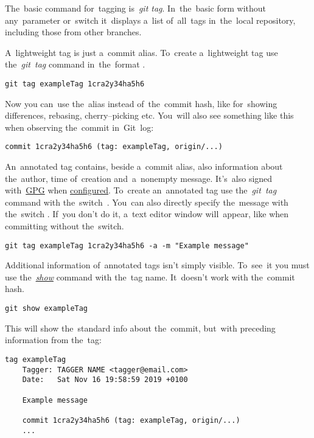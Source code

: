 The~basic command for~tagging is~\textit{git tag}.
In~the~basic form without any~parameter or~switch it~displays a~list of~all~tags in~the~local repository, including those from other branches.

A~lightweight tag is just a~commit alias.
To~create a~lightweight tag use the~\textit{git~tag} command in~the~format .

\example
\begin{lstlisting}[frame=no]
    git tag exampleTag 1cra2y34ha5h6
\end{lstlisting}

\noindent Now you can~use the~alias  instead of~the~commit hash, like for~showing differences, rebasing, cherry--picking etc.
You~will also see something like this when observing the~commit in~Git~log:
\begin{lstlisting}[frame=no]
    commit 1cra2y34ha5h6 (tag: exampleTag, origin/...)
\end{lstlisting}

\noindent An~annotated tag contains, beside a~commit alias, also information about the~author, time of~creation and~a~nonempty message.
It's~also signed with~\hyperref[gpg]{GPG} when \hyperref[gitbasicconfiguration]{configured}.
To~create an~annotated tag use the~\textit{git~tag} command with the~switch~.
You~can also directly specify the~message with the~switch .
If~you don't do it, a~text editor window will~appear, like when committing without the~switch.

\example
\begin{lstlisting}[frame=no]
    git tag exampleTag 1cra2y34ha5h6 -a -m "Example message"
\end{lstlisting}

\noindent Additional information of~annotated tags isn't simply visible.
To~see~it you must use the~\hyperref[gitshow]{\textit{show}} command with the~tag name.
It~doesn't work with the~commit hash.

\example
\begin{lstlisting}[frame=no]
    git show exampleTag
\end{lstlisting}

\noindent This will show the~standard info about the~commit, but~with preceding information from the~tag:
\begin{lstlisting}[frame=no]
    tag exampleTag
    Tagger: TAGGER NAME <tagger@email.com>
    Date:   Sat Nov 16 19:58:59 2019 +0100

    Example message

    commit 1cra2y34ha5h6 (tag: exampleTag, origin/...)
    ...
\end{lstlisting}

